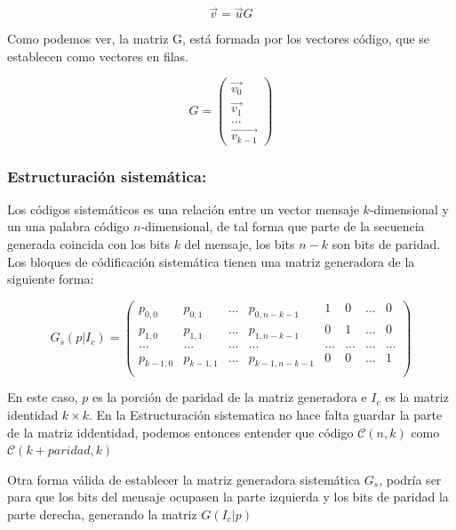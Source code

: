 \documentclass{article}
\begin{document}
\begin{equation}
    \vec{v} = \vec{u}G
\end{equation}

Como podemos ver, la matriz G, está formada por los vectores código, que se establecen como vectores en filas.

\begin{equation}
    G = 
    \left(
        \begin{array}{c}
            \vec{v_0} \\
            \vec{v_1} \\
            ... \\
            \vec{v_{k-1}}
        \end{array}
    \right)
\end{equation}

\subsubsection{Estructuración sistemática:} 

Los códigos sistemáticos es una relación entre un vector mensaje $k$-dimensional y un una palabra código $n$-dimensional, de tal forma que parte de la secuencia generada coincida con los bits $k$ del mensaje, los bits $n-k$ son bits de paridad. Los bloques de códificación sistemática tienen una matriz generadora de la siguiente forma:

\begin{equation}
    G_s(p|I_c) =
    \left(
        \begin{array}{cccc|cccc}
            p_{0,0} & p_{0,1} & ... & p_{0, n-k-1} & 1 & 0 & ...  & 0 \\
            p_{1,0} & p_{1,1} & ... & p_{1, n-k-1} & 0 & 1 & ...  & 0 \\
            ... & ... & ... & ... & ... & ... & ...  & ... \\
            p_{k-1,0} & p_{k-1,1} & ... & p_{k-1, n-k-1} & 0 & 0 & ...  & 1 \\
        \end{array}
    \right)
\end{equation}

En este caso, $p$ es la porción de paridad de la matriz generadora e $I_c$ es la matriz identidad $k\times k$. En la Estructuración sistematica no hace falta guardar la parte de la matriz iddentidad, podemos entonces entender que código $\mathcal{C}(n,k)$ como $\mathcal{C}(k+paridad,k)$

Otra forma válida de establecer la matriz generadora sistemática $G_s$, podría ser para que los bits del mensaje ocupasen la parte izquierda y los bits de paridad la parte derecha, generando la matriz $G(I_c|p)$
\end{document}
